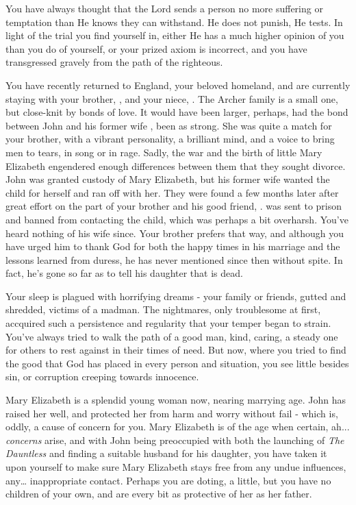\documentclass[char]{airship}
\begin{document}
\name{\cVicar{}}


You have always thought that the Lord sends a person no more suffering
or temptation than He knows they can withstand. He does not punish,
He tests. In light of the trial you find yourself in, either He has a
much higher opinion of you than you do of yourself, or your prized
axiom is incorrect, and you have transgressed gravely from the path of
the righteous.

You have recently returned to England, your beloved homeland, and are
currently staying with your brother, \cCaptain{\intro}, and your
niece, \cThief{\intro}. The Archer family is a small one, but
close-knit by bonds of love. It would have been larger, perhaps, had
the bond between John and his former wife \cCurie{}, been as
strong. She was quite a match for your brother, with a vibrant
personality, a brilliant mind, and a voice to bring men to tears, in
song or in rage. Sadly, the war and the birth of little Mary Elizabeth
engendered enough differences between them that they sought
divorce. John was granted custody of Mary Elizabeth, but his former
wife wanted the child for herself and ran off with her. They were
found a few months later after great effort on the part of your
brother and his good friend, \cBoddy{\intro}. \cCurie{} was sent to
prison and banned from contacting the child, which was perhaps a bit
overharsh. You've heard nothing of his wife since. Your brother
prefers that way, and although you have urged him to thank God for
both the happy times in his marriage and the lessons learned from
duress, he has never mentioned \cCurie{} since then without spite. In
fact, he's gone so far as to tell his daughter that \cCurie{} is dead.

Your sleep is plagued with horrifying dreams - your family or friends,
gutted and shredded, victims of a madman. The nightmares, only
troublesome at first, accquired such a persistence and regularity that
your temper began to strain. You've always tried to walk the path of a
good man, kind, caring, a steady one for others to rest against in
their times of need. But now, where you tried to find the good that
God has placed in every person and situation, you see little besides
sin, or corruption creeping towards innocence.

Mary Elizabeth is a splendid young woman now, nearing marrying
age. John has raised her well, and protected her from harm and worry
without fail - which is, oddly, a cause of concern for you. Mary
Elizabeth is of the age when certain, ah... {\em concerns} arise, and
with John being preoccupied with both the launching of {\it The
Dauntless} and finding a suitable husband for his daughter, you have
taken it upon yourself to make sure Mary Elizabeth stays free from any
undue influences, any{\ldots} inappropriate contact. Perhaps you are
doting, a little, but you have no children of your own, and are every
bit as protective of her as her father.
\end{document}
